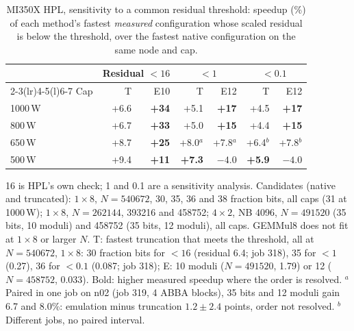 \documentclass[conference]{IEEEtran}
\newcommand{\W}{\,W}
\newcommand{\pct}{\%}
\begin{document}
\begin{table}[t]
\caption{MI350X HPL, sensitivity to a common residual threshold: speedup (\%) of each method's fastest \emph{measured}
configuration whose scaled residual is below the threshold, over the fastest native configuration on the same node and
cap.}\label{tab:hplthr}
\centering\footnotesize\setlength{\tabcolsep}{4pt}
\begin{tabular}{@{}lrrrrrr@{}}
\toprule
& \multicolumn{2}{c}{Residual $<16$} & \multicolumn{2}{c}{$<1$} & \multicolumn{2}{c}{$<0.1$} \\
\cmidrule(lr){2-3}\cmidrule(lr){4-5}\cmidrule(l){6-7}
Cap & T & E10 & T & E12 & T & E12 \\
\midrule
1000\W & +6.6 & \textbf{+34} & +5.1 & \textbf{+17} & +4.5 & \textbf{+17} \\
800\W & +6.7 & \textbf{+33} & +5.0 & \textbf{+15} & +4.4 & \textbf{+15} \\
650\W & +8.7 & \textbf{+25} & +8.0$^{a}$ & +7.8$^{a}$ & +6.4$^{b}$ & +7.8$^{b}$ \\
500\W & +9.4 & \textbf{+11} & \textbf{+7.3} & $-4.0$ & \textbf{+5.9} & $-4.0$ \\
\bottomrule
\end{tabular}
\par\vspace{2pt}\parbox{\textwidth}{\scriptsize 16 is HPL's own check; 1 and 0.1 are a sensitivity analysis. Candidates
(native and truncated): $1\times8$, $N=540672$, 30, 35, 36 and 38 fraction bits, all caps (31 at 1000\W); $1\times8$, $N=262144$, 393216 and
458752; $4\times2$, NB 4096, $N=491520$ (35 bits, 10 moduli) and 458752 (35 bits, 12 moduli), all caps. GEMMul8 does not
fit at $1\times8$ or larger $N$. T: fastest truncation that meets the threshold, all at $N=540672$, $1\times8$: 30 fraction bits for $<16$ (residual
6.4; job 318), 35 for $<1$ (0.27), 36 for $<0.1$ (0.087; job 318); E: 10 moduli ($N=491520$, 1.79) or 12 ($N=458752$,
0.033). Bold: higher measured speedup where the order is resolved. $^{a}$Paired in one job on n02 (job 319, 4 ABBA
blocks), 35 bits and 12 moduli gain 6.7 and 8.0\pct: emulation minus truncation $1.2\pm2.4$ points, order not resolved.
$^{b}$Different jobs, no paired interval.}
\end{table}
\end{document}
